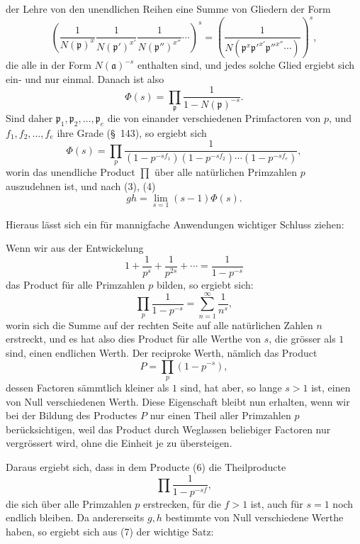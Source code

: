 \documentclass[11pt]{article}
\begin{document}
der Lehre von den unendlichen Reihen eine Summe von Gliedern der Form
\[
\left(\frac1{N(\mathfrak p)^x}\frac1{N(\mathfrak p')^{x'}}\frac1{N(\mathfrak p'')^{x''}}\cdots\right)^s
=\left(\frac1{N(\mathfrak p^x\mathfrak p'^{x'}\mathfrak p''^{x''}\cdots)}\right)^s,
\]
die alle in der Form $N(\mathfrak a)^{-s}$ enthalten sind, und jedes solche Glied ergiebt sich ein- und nur einmal. Danach ist also
\begin{equation}
\Phi(s)=\prod_{\mathfrak p}\frac1{1-N(\mathfrak p)^{-s}}.
\tag{5}
\end{equation}
Sind daher $\mathfrak p_1,\mathfrak p_2,\ldots,\mathfrak p_e$ die von einander verschiedenen Primfactoren von $p$, und $f_1,f_2,\ldots,f_e$ ihre Grade (\S~143), so ergiebt sich
\begin{equation}
\Phi(s)=\prod_p
\frac1{(1-p^{-sf_1})(1-p^{-sf_2})\cdots(1-p^{-sf_e})},
\tag{6}
\end{equation}
worin das unendliche Product $\prod$ über alle natürlichen Primzahlen $p$ auszudehnen ist, und nach (3), (4)
\begin{equation}
gh=\lim_{s=1}(s-1)\Phi(s).
\tag{7}
\end{equation}

Hieraus lässt sich ein für mannigfache Anwendungen wichtiger Schluss ziehen:

Wenn wir aus der Entwickelung
\[
1+\frac1{p^s}+\frac1{p^{2s}}+\cdots=\frac1{1-p^{-s}}
\]
das Product für alle Primzahlen $p$ bilden, so ergiebt sich:
\begin{equation}
\prod_p\frac1{1-p^{-s}}=\sum_{n=1}^{\infty}\frac1{n^s},
\tag{8}
\end{equation}
worin sich die Summe auf der rechten Seite auf alle natürlichen Zahlen $n$ erstreckt, und es hat also dies Product für alle Werthe von $s$, die grösser als $1$ sind, einen endlichen Werth. Der reciproke Werth, nämlich das Product
\begin{equation}
P=\prod_p(1-p^{-s}),
\tag{9}
\end{equation}
dessen Factoren sämmtlich kleiner als $1$ sind, hat aber, so lange $s>1$ ist, einen von Null verschiedenen Werth. Diese Eigenschaft bleibt nun erhalten, wenn wir bei der Bildung des Productes $P$ nur einen Theil aller Primzahlen $p$ berücksichtigen, weil das Product durch Weglassen beliebiger Factoren nur vergrössert wird, ohne die Einheit je zu übersteigen.

Daraus ergiebt sich, dass in dem Producte (6) die Theilproducte
\[
\prod\frac1{1-p^{-sf}},
\]
die sich über alle Primzahlen $p$ erstrecken, für die $f>1$ ist, auch für $s=1$ noch endlich bleiben. Da andererseits $g,h$ bestimmte von Null verschiedene Werthe haben, so ergiebt sich aus (7) der wichtige Satz:
\end{document}
